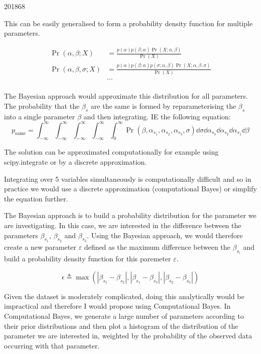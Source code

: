 \documentclass[10pt,\jkfside,a4paper]{article}
\begin{document}
\begin{examquestion}{2018}{6}{8}
\begin{enumerate}[label=(\alph*)]
\begin{itemize}
\end{itemize}

This can be easily generalised to form a probability density function for
multiple parameters.

\[
\begin{split}
\Pr(\alpha, \beta; X) &= \frac{p(\alpha)p(\beta; \alpha)\Pr(X; \alpha,
\beta)}{\Pr(X)} \\
\Pr(\alpha, \beta, \sigma; X) &= \frac{p(\alpha)p(\beta; \alpha)p(\sigma;
\alpha,\beta)\Pr(X; \alpha, \beta, \sigma)}{\Pr(X)} \\
&\dots \\
\end{split}
\]

The Bayesian approach would approximate this distribution for all parameters.
The probability that the $\beta_s$ are the same is formed by
reparameterising the $\beta_s$ into a single parameter $\beta$ and then
integrating. IE the following equation:
\[
p_{\text{same}} = \int^{\infty}_{-\infty}
\int^{\infty}_{-\infty}\int^{\infty}_{-\infty}\int^{\infty}_{-\infty}\int
^{\infty}_0 \Pr(\beta, \alpha_{s_1}, \alpha_{s_2}, \alpha_{s_3}, \sigma)
\dd{\sigma} \dd{\alpha_{s_3}} \dd{\alpha_{s_2}} \dd{\alpha_{s_1}} \dd{\beta}
\]

The solution can be approximated computationally for example using
scipy.integrate or by a discrete approximation.

Integrating over 5 variables simultaneously is computationally difficult
and so in practice we would use a discrete approximation (computational Bayes)
or simplify the equation further.

\fi

The Bayesian approach is to build a probability distribution for the parameter
we are investigating. In this case, we are interested in the difference
between the parameters $\beta_{s_1}$, $\beta_{s_2}$ and $\beta_{s_3}$. Using
the Bayesian approach, we would therefore create a new parameter $\varepsilon$
defined as the maximum difference between the $\beta_{s_i}$ and build a
probability density function for this paremeter $\varepsilon$.

\[
\epsilon \triangleq \max\left(\left|\beta_{s_1} - \beta_{s_2}\right|,
\left|\beta_{s_1} - \beta_{s_3}\right|, \left|\beta_{s_2} -
\beta_{s_3}\right|\right)
\]

Given the dataset is moderately complicated, doing this analytically would
be impractical and therefore I would propose using Computational Bayes. In
Computational Bayes, we generate a large number of parameters according
to their prior distributions and then plot a histogram of the distribution 
of the parameter we are interested in, weighted by the probability of the
observed data occurring with that parameter.


\end{enumerate}
\end{examquestion}
\end{document}

